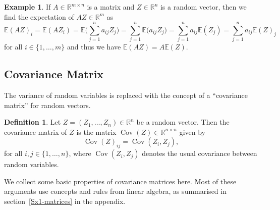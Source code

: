 \documentclass[
  a4paper,
]{article}
\theoremstyle{definition}
\newtheorem{definition}{Definition}[section]
\theoremstyle{definition}
\newtheorem{example}{Example}[section]
\theoremstyle{definition}
\theoremstyle{definition}
\theoremstyle{remark}
\begin{document}
\begin{example}
If \(A \in \mathbb{R}^{m\times n}\) is a matrix and \(Z \in \mathbb{R}^n\) is a random
vector, then we find the expectation of \(AZ\in\mathbb{R}^m\) as
\begin{equation*}
    \mathbb{E}(AZ)_i
    = \mathbb{E}(AZ_i)
    = \mathbb{E}\bigl( \sum_{j=1}^n a_{ij} Z_j \bigr)
    = \sum_{j=1}^n \mathbb{E}\bigl( a_{ij} Z_j \bigr)
    = \sum_{j=1}^n a_{ij} \mathbb{E}(Z_j)
    = \sum_{j=1}^n a_{ij} \mathbb{E}(Z)_j
  \end{equation*}
for all \(i \in \{1, \ldots, m\}\) and thus we have \(\mathbb{E}(AZ) = A \mathbb{E}(Z)\).
\end{example}

\hypertarget{sec:covariance}{%
\subsection{Covariance Matrix}\label{sec:covariance}}

The variance of random variables is replaced with the concept of
a ``covariance matrix'' for random vectors.

\begin{definition}
Let \(Z = (Z_1, \ldots, Z_n) \in \mathbb{R}^n\) be a random vector.
Then the covariance matrix of \(Z\) is the matrix \(\mathop{\mathrm{Cov}}(Z) \in \mathbb{R}^{n\times n}\)
given by
\begin{equation*}
    \mathop{\mathrm{Cov}}(Z)_{ij}
    = \mathop{\mathrm{Cov}}(Z_i, Z_j),
  \end{equation*}
for all \(i, j \in \{1, \ldots, n\}\),
where \(\mathop{\mathrm{Cov}}(Z_i, Z_j)\) denotes the usual covariance between random
variables.
\end{definition}

We collect some basic properties of covariance matrices here. Most of these
arguments use concepts and rules from linear algebra, as summarised in
section~\ref{Sx1-matrices} in the appendix.
\end{document}
